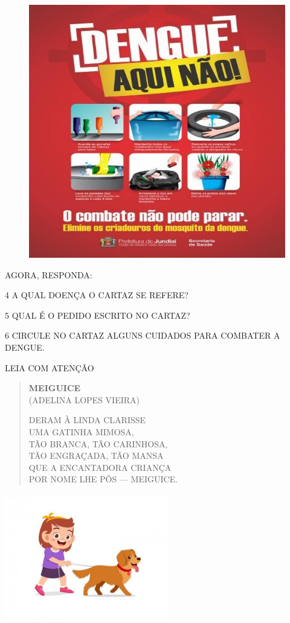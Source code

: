 \begin{figure}[htpb!]
\centering
\includegraphics[width=.8\textwidth]{media/image127.jpg}
\end{figure}

AGORA, RESPONDA:

\num{4} A QUAL DOENÇA O CARTAZ SE REFERE?


\num{5} QUAL É O PEDIDO ESCRITO NO CARTAZ?


\num{6} CIRCULE NO CARTAZ ALGUNS CUIDADOS PARA COMBATER A DENGUE.


\pagebreak
LEIA COM ATENÇÃO

\begin{minipage}{.7\textwidth}
\begin{verse}
\textbf{MEIGUICE}\\
(ADELINA LOPES VIEIRA)

DERAM À LINDA CLARISSE\\
UMA GATINHA MIMOSA,\\
TÃO BRANCA, TÃO CARINHOSA,\\
TÃO ENGRAÇADA, TÃO MANSA\\
QUE A ENCANTADORA CRIANÇA\\
POR NOME LHE PÔS --- MEIGUICE.
\end{verse}
\end{minipage}
\begin{minipage}{.3\textwidth}
\includegraphics[width=2.83472in,height=2.19792in]{media/image128.jpg}
\end{minipage}

